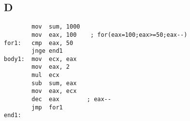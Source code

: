 \documentclass{hitec}
\begin{document}
\begin{minipage}{\linewidth}
\subsection*{D}
\begin{verbatim}
        mov  sum, 1000
        mov  eax, 100    ; for(eax=100;eax>=50;eax--)
for1:   cmp  eax, 50
        jnge end1
body1:  mov  ecx, eax
        mov  eax, 2
        mul  ecx
        sub  sum, eax
        mov  eax, ecx
        dec  eax        ; eax--
        jmp  for1
end1:
\end{verbatim}
\end{minipage}
\end{document}
